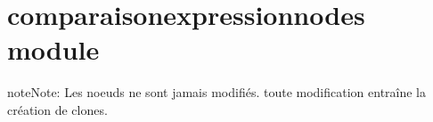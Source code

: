 \documentclass[letterpaper,10pt,french]{sphinxmanual}
\begin{document}
\section{comparaisonexpressionnodes module}
\label{\detokenize{comparaisonexpressionnodes:module-comparaisonexpressionnodes}}\label{\detokenize{comparaisonexpressionnodes:comparaisonexpressionnodes-module}}\label{\detokenize{comparaisonexpressionnodes::doc}}\label{\detokenize{comparaisonexpressionnodes:module-comparaisonexpressionodes}}
\begin{sphinxadmonition}{note}{Note:}
Les noeuds ne sont jamais modifiés. toute modification entraîne la création de clones.
\end{sphinxadmonition}
\end{document}
